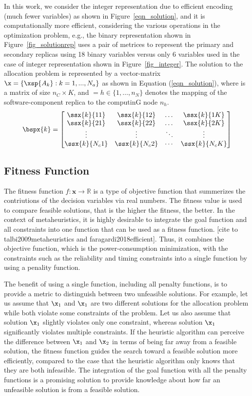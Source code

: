 In this work, we consider the integer representation due to efficient encoding (much fewer variables) as shown in Figure~\ref{eqn_solution}, and  it is computationally more efficient, considering the various operations in the optimization problem, e.g., the binary representation shown in Figure~\ref{fig_solutionrep} uses a pair of metrices to represent the primary and secondary replicas using 18 binary variables versus only 6 variables used in the case of integer representation shown in Figure~\ref{fig_integer}.
The solution to the allocation problem is represented by a vector-matrix $\x=\{\xsp{A_k}:k=1,...,N_a\}$ as shown in Equation (\ref{eqn_solution}), where  is a matrix of size $n_C\times K$, and $=h\in \{1,…,n_N\}$ denotes the mapping of the  software-component replica  to the computinG node $n_h$.
\begin{equation}
\label{eqn_solution}
\bspx{k}=
\begin{bmatrix} 
\ssx{k}{11} & \ssx{k}{12} & \dots & \ssx{k}{1K}\\
\ssx{k}{21} & \ssx{k}{22} & \dots & \ssx{k}{2K}\\
\vdots & \vdots & \ddots & \vdots\\
\ssx{k}{N_c1} & \ssx{k}{N_c2} & \cdots & \ssx{k}{N_cK}
\end{bmatrix}
\end{equation}

\subsection{Fitness Function}
The fitness function $f:\textbf{x}\rightarrow \mathbb{R}$ is a type of objective function that summerizes the contriutions of the decision variables via real numbers. The fitness value is used to compare feasible solutions, that is the higher the fitness, the better. In the context of metaheuristics, it is highly desirable to integrate the goal function and all constraints into one function that can be
used as a fitness function. [cite to talbi2009metaheuristics and faragardi2018efficient]. Thus, it combines the objective function, which is the power-consumption minimization, with the constraints such as the reliability and timing constraints into a single function by using a penality function. 

The benefit of using a single function, including all penalty functions, is to provide a metric to distinguish between two unfeasible solutions. For example, let us assume that $\x_1$ and $\x_1$ are two different solutions for the allocation problem while both violate
some constraints of the problem. Let us also assume that solution
$\x_1$ slightly violates only one constraint, whereas solution
$\x_1$ significantly violates multiple constraints. If the heuristic algorithm can perceive the difference between $\x_1$ and $\x_2$
in terms of being far away from a feasible solution, the fitness function guides the search toward a feasible solution more efficiently, compared to the case that the heuristic algorithm only knows that they are both infeasible. The integration of the goal function with all
the penalty functions is a promising solution to provide knowledge about how far an unfeasible solution is from a feasible
solution. 

